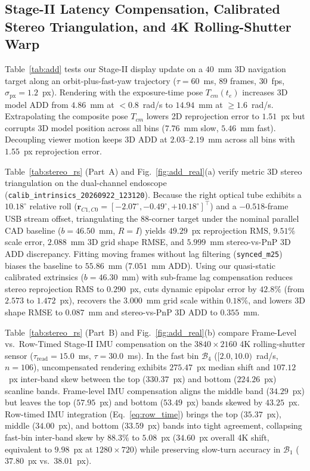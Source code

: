 \documentclass[journal]{IEEEtran}
\begin{document}
\subsection{Stage-II Latency Compensation, Calibrated Stereo Triangulation, and 4K Rolling-Shutter Warp}
Table~\ref{tab:add} tests our Stage-II display update on a $40$~mm 3D navigation target along an orbit-plus-fast-yaw trajectory ($\tau = 60$~ms, $89$ frames, $30$~fps, $\sigma_{\text{px}}=1.2$~px). Rendering with the exposure-time pose $T_{cm}(t_e)$ increases 3D model ADD from $4.86$~mm at $<0.8$~rad/s to $14.94$~mm at $\ge 1.6$~rad/s. Extrapolating the composite pose $T_{cm}$ lowers 2D reprojection error to $1.51$~px but corrupts 3D model position across all bins ($7.76$~mm slow, $5.46$~mm fast). Decoupling viewer motion keeps 3D ADD at $2.03\text{--}2.19$~mm across all bins with $1.55$~px reprojection error.

Table~\ref{tab:stereo_rs} (Part~A) and Fig.~\ref{fig:add_real}(a) verify metric 3D stereo triangulation on the dual-channel endoscope (\texttt{calib\_intrinsics\_20260922\_123120}). Because the right optical tube exhibits a $10.18^\circ$ relative roll ($\mathbf{r}_{C1,C0}=[-2.07^\circ, -0.49^\circ, +10.18^\circ]^\top$) and a $-0.518$-frame USB stream offset, triangulating the $88$-corner target under the nominal parallel CAD baseline ($b=46.50$~mm, $R=I$) yields $49.29$~px reprojection RMS, $9.51\%$ scale error, $2.088$~mm 3D grid shape RMSE, and $5.999$~mm stereo-vs-PnP 3D ADD discrepancy. Fitting moving frames without lag filtering (\texttt{synced\_m25}) biases the baseline to $55.86$~mm ($7.051$~mm ADD). Using our quasi-static calibrated extrinsics ($b=46.30$~mm) with sub-frame lag compensation reduces stereo reprojection RMS to $0.290$~px, cuts dynamic epipolar error by $42.8\%$ (from $2.573$ to $1.472$~px), recovers the $3.000$~mm grid scale within $0.18\%$, and lowers 3D shape RMSE to $0.087$~mm and stereo-vs-PnP 3D ADD to $0.355$~mm.

Table~\ref{tab:stereo_rs} (Part~B) and Fig.~\ref{fig:add_real}(b) compare Frame-Level vs.\ Row-Timed Stage-II IMU compensation on the $3840\times2160$ 4K rolling-shutter sensor ($\tau_{\text{read}}=15.0$~ms, $\tau=30.0$~ms). In the fast bin $\mathcal{B}_4$ ($[2.0,10.0)$~rad/s, $n=106$), uncompensated rendering exhibits $275.47$~px median shift and $107.12$~px inter-band skew between the top ($330.37$~px) and bottom ($224.26$~px) scanline bands. Frame-level IMU compensation aligns the middle band ($34.29$~px) but leaves the top ($57.95$~px) and bottom ($53.49$~px) bands skewed by $43.25$~px. Row-timed IMU integration (Eq.~\eqref{eq:row_time}) brings the top ($35.37$~px), middle ($34.00$~px), and bottom ($33.59$~px) bands into tight agreement, collapsing fast-bin inter-band skew by $88.3\%$ to $5.08$~px ($34.60$~px overall 4K shift, equivalent to $9.98$~px at $1280\times720$) while preserving slow-turn accuracy in $\mathcal{B}_1$ ($37.80$~px vs.\ $38.01$~px).
\end{document}
